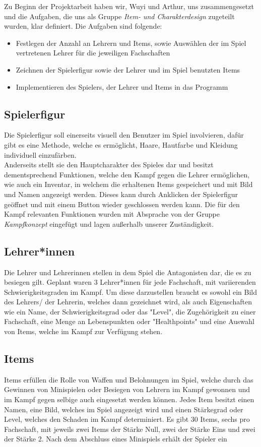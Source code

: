 Zu Beginn der Projektarbeit haben wir, Wuyi und Arthur, uns zusammengesetzt und die Aufgaben, die uns als Gruppe \emph{Item- und Charakterdesign} zugeteilt wurden, klar definiert. Die Aufgaben sind folgende:

\begin{itemize}
	\item Festlegen der Anzahl an Lehrern und Items, sowie Auswählen der im Spiel vertretenen Lehrer für die jeweiligen Fachschaften
	\item Zeichnen der Spielerfigur sowie der Lehrer und im Spiel benutzten Items
	\item Implementieren des Spielers, der Lehrer und Items in das Programm 
\end{itemize}

\subsection{Spielerfigur}
Die Spielerfigur soll einerseits visuell den Benutzer im Spiel involvieren, dafür gibt es eine Methode, welche es ermöglicht, Haare, Hautfarbe und Kleidung individuell einzufärben.\\ Anderseits stellt sie den Hauptcharakter des Spieles dar und besitzt dementsprechend Funktionen, welche den Kampf gegen die Lehrer ermöglichen, wie auch ein Inventar, in welchem die erhaltenen Items gespeichert und mit Bild und Namen angezeigt werden. Dieses kann durch Anklicken der Spielerfigur geöffnet und mit einem Button wieder geschlossen werden kann. Die für den Kampf relevanten Funktionen wurden mit Absprache von der Gruppe \emph{Kampfkonzept} eingefügt und lagen außerhalb unserer Zuständigkeit.\\

\subsection{Lehrer*innen}
Die Lehrer und Lehrerinnen stellen in dem Spiel die Antagonisten dar, die es zu besiegen gilt. Geplant waren 3 Lehrer*innen für jede Fachschaft, mit variierenden Schwierigkeitsgraden im Kampf. Um diese darzustellen braucht es sowohl ein Bild des Lehrers/ der Lehrerin, welches dann gezeichnet wird, als auch Eigenschaften wie ein Name, der Schwierigkeitsgrad oder das "Level", die Zugehörigkeit zu einer Fachschaft, eine Menge an Lebenspunkten oder "Healthpoints" und eine Auswahl von Items, welche im Kampf zur Verfügung stehen.

\subsection{Items}
Items erfüllen die Rolle von Waffen und Belohnungen im Spiel, welche durch das Gewinnen von Minispielen oder Besiegen von Lehrern im Kampf gewonnen und im Kampf gegen selbige auch eingesetzt werden können. Jedes Item besitzt einen Namen, eine Bild, welches im Spiel angezeigt wird und einen Stärkegrad oder Level, welches den Schaden im Kampf determiniert. Es gibt 30 Items, sechs pro Fachschaft, mit jeweils zwei Items der Stärke Null, zwei der Stärke Eins und zwei der Stärke 2. Nach dem Abschluss eines Minispiels erhält der Spieler ein 
